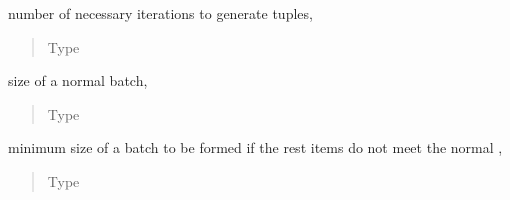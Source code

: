\documentclass[a4paper,12pt,english]{sphinxmanual}
\begin{document}
\begin{fulllineitems}
\begin{fulllineitems}
\end{fulllineitems}


\begin{fulllineitems}
\label{\detokenize{project_rst/generator:project.generator.DataGenerator.num_iter}}
number of necessary iterations to generate tuples,
 
\begin{quote}\begin{description}
\item[{Type}] \leavevmode
{}

\end{description}\end{quote}

\end{fulllineitems}


\begin{fulllineitems}
\label{\detokenize{project_rst/generator:project.generator.DataGenerator.batch_size}}
size of a normal batch,  
\begin{quote}\begin{description}
\item[{Type}] \leavevmode
{}

\end{description}\end{quote}

\end{fulllineitems}


\begin{fulllineitems}
\label{\detokenize{project_rst/generator:project.generator.DataGenerator.minimum}}
minimum size of a batch to be formed if the rest
items do not meet the normal {\hyperref[\detokenize{project_rst/generator:project.generator.DataGenerator.batch_size}]{}},  
\begin{quote}\begin{description}
\item[{Type}] \leavevmode
{}


\end{description}
\end{quote}
\end{fulllineitems}
\end{fulllineitems}
\end{document}
